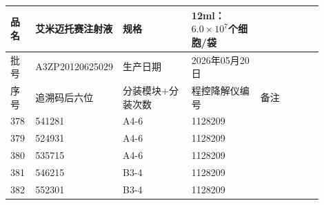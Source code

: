 \documentclass[UTF8,10pt,a4paper,fontset=fandol]{ctexart}
\newcommand{\fieldvalue}[1]{#1}
\begin{document}
\begin{center}
\small
\begin{tabular}{|p{0.08\linewidth}|p{0.18\linewidth}|p{0.22\linewidth}|p{0.22\linewidth}|p{0.20\linewidth}|}
\hline
品名 &
\fieldvalue{艾米迈托赛注射液} &
规格 &
\fieldvalue{12ml：$6.0\times10^{7}$个细胞/袋} &
\\ \hline
批号 &
\fieldvalue{A3ZP20120625029} &
生产日期 &
\fieldvalue{2026年05月20日} &
\\ \hline
序号 & 追溯码后六位 & 分装模块+分装次数 & 程控降解仪编号 & 备注 \\
\hline
\fieldvalue{378} &
\fieldvalue{541281} &
\fieldvalue{A4-6} &
\fieldvalue{1128209} & \\ \hline
\fieldvalue{379} &
\fieldvalue{524931} &
\fieldvalue{A4-6} &
\fieldvalue{1128209} & \\ \hline
\fieldvalue{380} &
\fieldvalue{535715} &
\fieldvalue{A4-6} &
\fieldvalue{1128209} & \\ \hline
\fieldvalue{381} &
\fieldvalue{546215} &
\fieldvalue{B3-4} &
\fieldvalue{1128209} & \\ \hline
\fieldvalue{382} &
\fieldvalue{552301} &
\fieldvalue{B3-4} &
\fieldvalue{1128209} & \\ \hline

\end{tabular}
\end{center}
\end{document}
